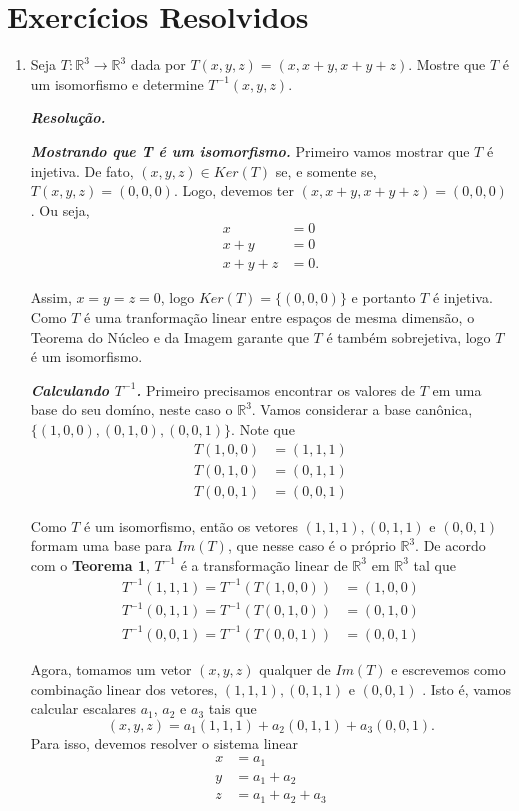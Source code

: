 \section{Exercícios Resolvidos}
\begin{enumerate}
\item Seja $T: \mathbb{R}^3 \rightarrow\mathbb{R}^3$ dada por  $T(x,y,z)=(x, x+y, x+y+z)$. Mostre que $T$ é um isomorfismo e  determine $T^{-1}(x,y,z)$.

\textbf{\textit{Resolução.} }

\textit{\textbf{Mostrando que T é um isomorfismo.}} Primeiro vamos mostrar que $T$ é injetiva.  De fato, $(x,y,z) \in Ker(T)$ se,  e somente se, $T(x,y,z)=(0,0,0)$.  Logo, devemos ter $(x,x+y,x+y+z)=(0,0,0)$. Ou seja,
\begin{align*}
x&=0\\
x+y&=0\\
             x+y+z&=0.
\end{align*}

Assim, $x=y=z=0$, logo $Ker(T)=\{ (0,0,0)\}$ e portanto $T$ é injetiva.  Como $T$ é uma tranformação linear entre espaços de mesma dimensão, o Teorema do Núcleo e da Imagem garante que $T$ é também sobrejetiva, logo $T$ é um isomorfismo.

\textit{\textbf{Calculando  $T^{-1}$.}} Primeiro precisamos encontrar os valores de $T$ em uma base do seu domíno, neste caso o $\mathbb{R}^3$. Vamos considerar a base canônica, $\{(1,0,0),(0,1,0), (0,0,1)\}$.  Note que
\begin{align*}
T(1,0,0)&=(1,1,1)\\
T(0,1,0)&=(0,1,1)\\
T(0,0,1)&= (0,0,1)
\end{align*}

Como $T$ é um isomorfismo, então os vetores  $(1,1,1), (0,1,1)$ e $ (0,0,1)$  formam uma base para $Im(T)$, que nesse caso é o próprio $\mathbb{R}^3 $. De acordo com o \textbf{Teorema 1},  $T^{-1}$ é a transformação linear de  $\mathbb{R}^3 $ em  $\mathbb{R}^3 $ tal que
\begin{align*}
T^{-1}(1,1,1)=T^{-1}(T(1,0,0))&=(1,0,0)\\
T^{-1}(0,1,1)=T^{-1}(T(0,1,0))&=(0,1,0)\\
T^{-1}(0,0,1)=T^{-1}(T(0,0,1))&= (0,0,1)
\end{align*}


 Agora, tomamos um vetor $(x,y,z)$ qualquer de $Im(T)$ e escrevemos como combinação linear dos vetores, $(1,1,1), (0,1,1)$ e $ (0,0,1)$ . Isto é, vamos calcular escalares $a_1$, $a_2$ e $a_3$ tais que $$(x,y,z)= a_1(1,1,1)+a_2 (0,1,1)+a_3 (0,0,1).$$ Para isso, devemos resolver o sistema linear
\begin{align*}
x&=a_1\\
y&=a_1+a_2\\
z&=a_1+a_2+a_3
\end{align*}


\end{enumerate}
